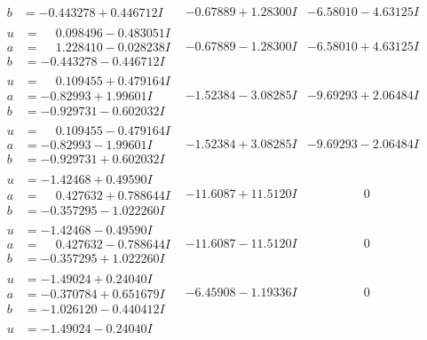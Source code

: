 \documentclass[1p]{elsarticle_modified}
\theoremstyle{definition}
\begin{document}
$$\begin{array}{c|c|c}
\begin{aligned}
b &= -0.443278 + 0.446712 I\end{aligned}
 & -0.67889 + 1.28300 I & -6.58010 - 4.63125 I \\ \hline\begin{aligned}
u &= \phantom{-}0.098496 - 0.483051 I \\
a &= \phantom{-}1.228410 - 0.028238 I \\
b &= -0.443278 - 0.446712 I\end{aligned}
 & -0.67889 - 1.28300 I & -6.58010 + 4.63125 I \\ \hline\begin{aligned}
u &= \phantom{-}0.109455 + 0.479164 I \\
a &= -0.82993 + 1.99601 I \\
b &= -0.929731 - 0.602032 I\end{aligned}
 & -1.52384 - 3.08285 I & -9.69293 + 2.06484 I \\ \hline\begin{aligned}
u &= \phantom{-}0.109455 - 0.479164 I \\
a &= -0.82993 - 1.99601 I \\
b &= -0.929731 + 0.602032 I\end{aligned}
 & -1.52384 + 3.08285 I & -9.69293 - 2.06484 I \\ \hline\begin{aligned}
u &= -1.42468 + 0.49590 I \\
a &= \phantom{-}0.427632 + 0.788644 I \\
b &= -0.357295 - 1.022260 I\end{aligned}
 & -11.6087 + 11.5120 I & \phantom{-0.000000 } 0 \\ \hline\begin{aligned}
u &= -1.42468 - 0.49590 I \\
a &= \phantom{-}0.427632 - 0.788644 I \\
b &= -0.357295 + 1.022260 I\end{aligned}
 & -11.6087 - 11.5120 I & \phantom{-0.000000 } 0 \\ \hline\begin{aligned}
u &= -1.49024 + 0.24040 I \\
a &= -0.370784 + 0.651679 I \\
b &= -1.026120 - 0.440412 I\end{aligned}
 & -6.45908 - 1.19336 I & \phantom{-0.000000 } 0 \\ \hline\begin{aligned}
u &= -1.49024 - 0.24040 I \\

\end{aligned}
\end{array}$$
\end{document}
